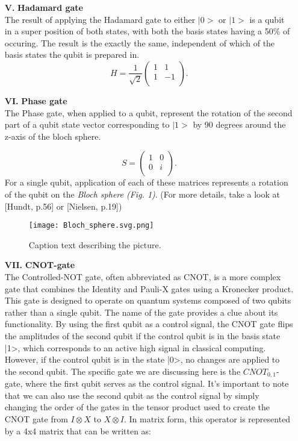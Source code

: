 \documentclass[onecolumn,10pt,cleanfoot]{asme2ej}
\begin{document}
\begin{enumerate}
	\item[\textbf{V.}] \textbf{Hadamard gate} \\
		The result of applying the Hadamard gate to either $|0>$ or $|1>$ is a qubit in a super position of both states, with both the basis states having a 50\% of occuring. The result is the exactly the same, independent of which of the basis states the qubit is prepared in.
		\begin{equation*}
			H = \frac{1}{\sqrt{2}} \begin{pmatrix}
			1 & 1 \\
			1 & -1 \\
		\end{pmatrix}.
	\end{equation*}

	\item[\textbf{VI.}] \textbf{Phase gate} \\
		The Phase gate, when applied to a qubit, represent the rotation of the second part of a qubit state vector corresponding to $|1>$ by 90 degrees around the z-axis of the bloch sphere.

		\begin{equation*}
			S = \begin{pmatrix}
			1 & 0 \\
			0 & i \\
		\end{pmatrix}.
	\end{equation*}
		For a single qubit, application of each of these matrices represents a rotation of the qubit on the \textit{Bloch sphere (Fig. 1)}. (For more details, take a look at [Hundt, p.56] or [Nielsen, p.19])

\begin{figure}[ht]
  \centering
  \texttt{[image: Bloch\_sphere.svg.png]}
  \caption{Caption text describing the picture.}
  \label{fig:example}
\end{figure}

	\item[\textbf{VII.}] \textbf{CNOT-gate} \\
		The Controlled-NOT gate, often abbreviated as CNOT, is a more complex gate that combines the Identity and Pauli-X gates using a Kronecker product. This gate is designed to operate on quantum systems composed of two qubits rather than a single qubit. The name of the gate provides a clue about its functionality. By using the first qubit as a control signal, the CNOT gate flips the amplitudes of the second qubit if the control qubit is in the basis state |1>, which corresponds to an active high signal in classical computing. However, if the control qubit is in the state |0>, no changes are applied to the second qubit. The specific gate we are discussing here is the $CNOT_{0,1}$-gate, where the first qubit serves as the control signal.
		It's important to note that we can also use the second qubit as the control signal by simply changing the order of the gates in the tensor product used to create the CNOT gate from $I \otimes X$ to $X \otimes I$. In matrix form, this operator is represented by a 4x4 matrix that can be written as:
		

\end{enumerate}
\end{document}
